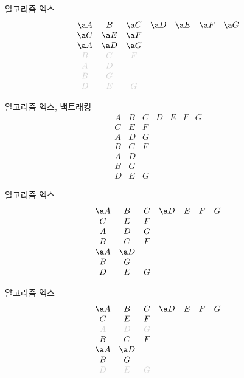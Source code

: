 \documentclass[xcolor=svgnames]{beamer}
\begin{document}
%
\begin{frame}{알고리즘 엑스}
  \Large\boldmath
  $$
  \begin{array}{ccccccc}
    \a A & B & \a C & \a D & \a E & \a F & \a G\\
    \a C & \a E & \a F &&&&\\
    \a A & \a D & \a G &&&&\\
    \g B & \g C & \g F &&&&\\
    \g A & \g D &&&&&\\
    \g B & \g G &&&&&\\
    \g D & \g E & \g G &&&&
  \end{array}
  $$
\end{frame}

%
\begin{frame}{알고리즘 엑스, 백트래킹}
\Large\boldmath
  $$
  \begin{array}{ccccccc}
    A & B & C & D & E & F & G\\
    C & E & F &&&&\\
    A & D & G &&&&\\
    B & C & F &&&&\\
    A & D &&&&&\\
    B & G &&&&&\\
    D & E & G &&&&
  \end{array}
  $$
\end{frame}

%
\begin{frame}{알고리즘 엑스}
\Large\boldmath
  $$
  \begin{array}{ccccccc}
    \a A & B & C & \a D & E & F & G\\
    C & E & F &&&&\\
    A & D & G &&&&\\
    B & C & F &&&&\\
    \a A & \a D &&&&&\\
    B & G &&&&&\\
    D & E & G &&&&
  \end{array}
  $$
\end{frame}

%
\begin{frame}{알고리즘 엑스}
\Large\boldmath
  $$
  \begin{array}{ccccccc}
    \a A & B & C & \a D & E & F & G\\
    C & E & F &&&&\\
    \g A & \g D & \g G &&&&\\
    B & C & F &&&&\\
    \a A & \a D &&&&&\\
    B & G &&&&&\\
    \g D & \g E & \g G &&&&
  \end{array}
  $$
\end{frame}
\end{document}
